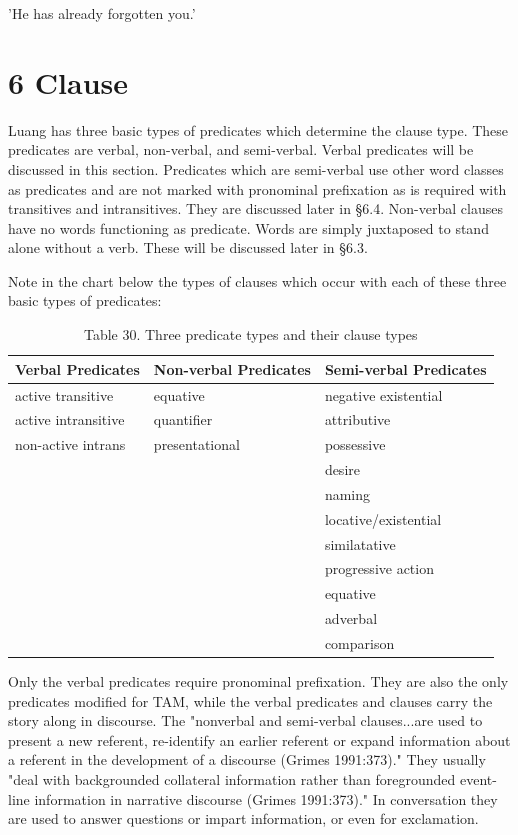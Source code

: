 \documentclass[10pt]{article}
\begin{document}
'He has already forgotten you.'

\section*{6 Clause}
Luang has three basic types of predicates which determine the clause type. These predicates are verbal, non-verbal, and semi-verbal. Verbal predicates will be discussed in this section. Predicates which are semi-verbal use other word classes as predicates and are not marked with pronominal prefixation as is required with transitives and intransitives. They are discussed later in §6.4. Non-verbal clauses have no words functioning as predicate. Words are simply juxtaposed to stand alone without a verb. These will be discussed later in §6.3.

Note in the chart below the types of clauses which occur with each of these three basic types of predicates:

\begin{table}[h]
\begin{center}
\captionsetup{labelformat=empty}
\caption{Table 30. Three predicate types and their clause types}
\begin{tabular}{|l|l|l|}
\hline
Verbal Predicates & Non-verbal Predicates & Semi-verbal Predicates \\
\hline
active transitive & equative & negative existential \\
\hline
active intransitive & quantifier & attributive \\
\hline
non-active intrans & presentational & possessive \\
\hline
 &  & desire \\
\hline
 &  & naming \\
\hline
 &  & locative/existential \\
\hline
 &  & similatative \\
\hline
 &  & progressive action \\
\hline
 &  & equative \\
\hline
 &  & adverbal \\
\hline
 &  & comparison \\
\hline
\end{tabular}
\end{center}
\end{table}

Only the verbal predicates require pronominal prefixation. They are also the only predicates modified for TAM, while the verbal predicates and clauses carry the story along in discourse. The "nonverbal and semi-verbal clauses...are used to present a new referent, re-identify an earlier referent or expand information about a referent in the development of a discourse (Grimes 1991:373)." They usually "deal with backgrounded collateral information rather than foregrounded event-line information in narrative discourse (Grimes 1991:373)." In conversation they are used to answer questions or impart information, or even for exclamation.
\end{document}
